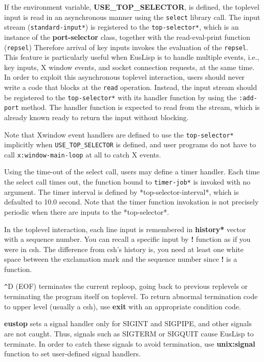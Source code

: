 If the environment variable, {\bf USE\_TOP\_SELECTOR}, is defined,
the toplevel input is read in an asynchronous manner using the {\tt select} 
library call.
The input stream ({\tt *standard-input*}) is registered to
the {\tt *top-selector*},
which is an instance of the {\bf port-selector} class,
together with the read-eval-print function ({\tt repsel})
Therefore arrival of key inputs invokes the evaluation of the {\tt repsel}.
This feature is particularly useful when EusLisp is to handle
multiple events, i.e., key inputs, X window events, and socket connection
requests, at the same time.
In order to exploit this asynchronous toplevel interaction,
users should never write a code that blocks  at  the {\tt read} operation.
Instead, the input stream should be registered to the {\tt *top-selector*}
with its handler function by using the {\tt :add-port} method.
The handler function is expected to read from the stream,
which is already known ready to return the input without blocking.

Note that Xwindow event handlers are defined to use the {\tt *top-selector*}
implicitly when {\tt USE\_TOP\_SELECTOR} is defined, and user programs do not
have to call {\tt x:window-main-loop} at all to catch X events.

Using the time-out of the select call, users may define a timer handler.
Each time the select call times out, the function
bound to {\tt *timer-job*} is invoked with no argument.
The timer interval is defined by *top-selector-interval*, which is 
defaulted to 10.0 second.
Note that the timer function invokation is not precisely periodic
when there are inputs to the *top-selector*.

In the toplevel interaction,
each line input is remembered in {\bf *history*} vector with a sequence
number.
You can recall a specific input by {\bf !} function
as if you were in csh.
The difference from csh's history is, you need at least one white space
between the exclamation mark and the sequence number since {\bf !}
is a function.

\verb+^+D (EOF) terminates the current reploop, going back to previous replevels or terminating the program itself on toplevel.
To return abnormal termination code to upper level (usually a csh),
use {\bf exit} with an appropriate condition code.

{\bf eustop} sets a signal handler only for SIGINT and SIGPIPE,
and other signals are not caught.
Thus, signals such as SIGTERM or SIGQUIT cause EusLisp to terminate.
In order to catch these signals to avoid termination,
use {\bf unix:signal} function to set user-defined signal handlers.

